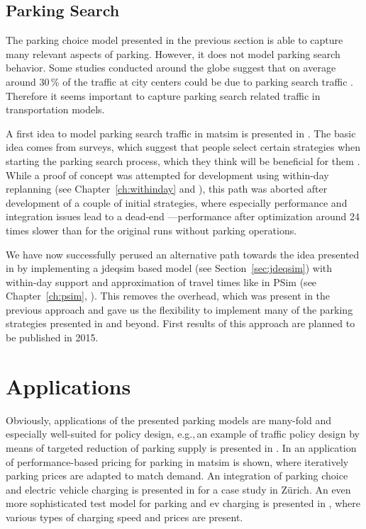 \subsection{Parking Search}
The parking choice model presented in the previous section is able to capture many relevant aspects of parking. However, it does not model parking search behavior. Some studies conducted around the globe suggest that on average around 30\,\% of the traffic at city centers could be due to parking search traffic \citet[][]{Shoup_RSUE_2004}. Therefore it seems important to capture parking search related traffic in transportation models.

A first idea to model parking search traffic in \gls{matsim} is presented in \citet[][]{Waraich_unpub_IATBR_2012}. The basic idea comes from surveys, which suggest that people select certain strategies when starting the parking search process, which they think will be beneficial for them \citet[][]{AxhausenPolak_1989}. While a proof of concept was attempted for development using within-day replanning (see Chapter~\ref{ch:withinday} and \citep[][]{DoblerEtAl_TRR_2012}), this path was aborted after development of a couple of initial strategies, where especially performance and integration issues lead to a dead-end \citet[][]{WaraichEtAl_unpub_TRB_2013}---performance after optimization around 24\,times slower than for the original runs without parking operations. 

We have now successfully perused an alternative path towards the idea presented in \citet[][]{Waraich_unpub_IATBR_2012} by implementing a \gls{jdeqsim} based model (see Section~\ref{sec:jdeqsim}) with within-day support and approximation of travel times like in PSim (see Chapter~\ref{ch:psim}, \citet[][]{FourieEtAl_TRR_2013}). This removes the overhead, which was present in the previous approach and gave us the flexibility to implement many of the parking strategies presented in \citet[][]{AxhausenPolak_1989} and beyond. First results of this approach are planned to be published in 2015.

\section{Applications}
Obviously, applications of the presented parking models are many-fold and especially well-suited for policy design, e.g.,\,an example of traffic policy design by means of targeted reduction of parking supply is presented in \citet[][]{WaraichAxhausen_TRR_2012}. In \citet[][]{WaraichEtAl_unpub_TRB_2013} an application of performance-based pricing for parking in \gls{matsim} is shown, where iteratively parking prices are adapted to match demand. An integration of parking choice and electric vehicle charging is presented in \citet[][]{WaraichEtAl_JanssensEtAl_2014} for a case study in Zürich. An even more sophisticated test model for parking and \gls{ev} charging is presented in \citet[][]{BemetzHohenfellner_BSCThesis_2014}, where various types of charging speed and prices are present.

